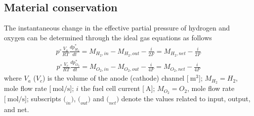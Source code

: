 \documentclass[12pt,a4paper]{scrartcl}
\begin{document}
\begin{onehalfspace}
\subsection{Material conservation}
The instantaneous change in the effective partial pressure of hydrogen and oxygen can be determined through the ideal gas equations as follows
\begin{equation}\label{eq14}
	\begin{aligned}
		p^\circ\frac{V_a}{RT}\frac{dp_{H_2}^*}{dt} = M_{H_2,in} - M_{H_2,out} - \frac{i}{2F} = M_{H_2,net} - \frac{i}{2F}
	\end{aligned}
\end{equation}
\begin{equation}\label{eq15}
	\begin{aligned}
		p^\circ\frac{V_c}{RT}\frac{dp_{O_2}^*}{dt} = M_{O_2,in} - M_{O_2,out} - \frac{i}{4F} = M_{O_2,net} - \frac{i}{4F}
	\end{aligned}
\end{equation}
where $V_a$ ($V_c$) is the volume of the anode (cathode) channel $\Big[\SI{}{\cubic\meter}\Big]$; $M_{H_2}=H_2$, mole flow rate $\Big[\SI{}{\mole\per\second}\Big]$; $i$ the fuel cell current $\Big[\SI{}{\ampere}\Big]$; $M_{O_2}=O_2$, mole flow rate $\Big[\SI{}{\mole\per\second}\Big]$; subscripts $\Big(_{in}\Big)$, $\Big(_{out}\Big)$ and $\Big(_{net}\Big)$ denote the values related to input, output, and net.


\end{onehalfspace}
\end{document}
